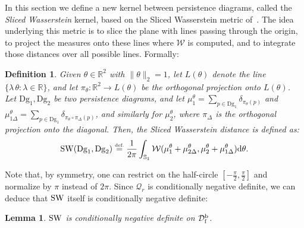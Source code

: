 \documentclass[11pt]{article}
\newcommand{\R}{\mathbb{R}}
\newcommand{\Dg}{\mathrm{Dg}}
\newcommand{\SW}{{\rm SW}}
\newcommand{\SpfbD}{{\mathcal D}_{\rm f}^{\rm b}}
\newtheorem{lem}[thm]{Lemma}
\newtheorem{defin}[thm]{Definition}
\newcommand{\eqdef}{\ensuremath{\stackrel{\mbox{\upshape\tiny def.}}{=}}}
\begin{document}
In this section we define a new kernel between persistence diagrams, called the {\em Sliced Wasserstein} kernel,
based on the Sliced Wasserstein metric of~\cite{Rabin11}. The idea underlying this
metric is to slice the plane with lines passing through the origin, to
project the measures onto these lines where $\mathcal W$ is computed, 
and to integrate those distances over all possible lines.  Formally:

\begin{defin}  
Given $\theta\in\R^2$ with $\|\theta\|_2=1$, let $L(\theta)$ denote the line $\{\lambda\,\theta : \lambda\in\R\}$, and
let $\pi_\theta:\R^2\rightarrow L(\theta)$ be the orthogonal projection onto $L(\theta)$.
Let $\Dg_1,\Dg_2$ be two persistence diagrams, and let $\mu_1^\theta=\sum_{p\in \Dg_1}\delta_{\pi_\theta(p)}$ and 
$\mu_{1\Delta}^\theta=\sum_{p\in \Dg_1}\delta_{\pi_\theta\circ\pi_\Delta(p)}$,
and similarly for $\mu_2^\theta$, where $\pi_\Delta$ is the orthogonal projection onto the diagonal.
Then, the {\em Sliced Wasserstein distance} 
is defined as:
$$\SW(\Dg_1,\Dg_2)\eqdef\frac{1}{2\pi}\int_{\mathbb{S}_1} \mathcal W(\mu_1^\theta+\mu_{2\Delta}^\theta,\mu_2^\theta+\mu_{1\Delta}^\theta){\rm d}\theta.$$
\end{defin} 



























Note that, by symmetry, one can restrict on the half-circle $[-\frac\pi 2,\frac\pi 2]$ and normalize by $\pi$ instead of $2\pi$.
Since $\mathcal Q_r$ is conditionally negative definite,
we can deduce that $\SW$ itself is conditionally negative definite:

\begin{lem}\label{lem:nd}
$\SW$ is conditionally negative definite on $\SpfbD$.
\end{lem}
\end{document}
